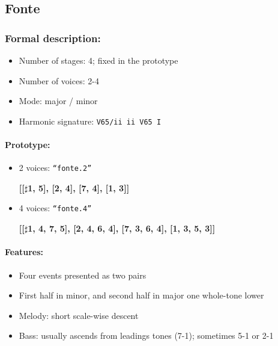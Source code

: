 ﻿\documentclass[11pt, openany]{article}
\begin{document}
	\subsection{Fonte}
	
\subsubsection{Formal description:}
\begin{itemize}
\item Number of stages: 4; fixed in the prototype
\item Number of voices: 2-4
\item Mode: major / minor
\item Harmonic signature: \texttt{V65/ii ii V65 I}
\end{itemize}

\paragraph{Prototype:}
\begin{itemize}
\item 2 voices: \texttt{“fonte.2”}
	\begin{center}
	\textbf{[[$\sharp$1, 5], [2, 4], [7, 4], [1, 3]]}
	\end{center}
\item 4 voices: \texttt{“fonte.4”}
	\begin{center}
	\textbf{[[$\sharp$1, 4, 7, 5], [2, 4, 6, 4], [7, 3, 6, 4], [1, 3, 5, 3]]}
	\end{center}
\end{itemize}

\paragraph{Features:}
\begin{itemize}
\item Four events presented as two pairs
\item First half in minor, and second half in major one whole-tone lower
\item Melody: short scale-wise descent
\item Bass: usually ascends from leadings tones (7-1); sometimes 5-1 or 2-1
\end{itemize}
\end{document}
